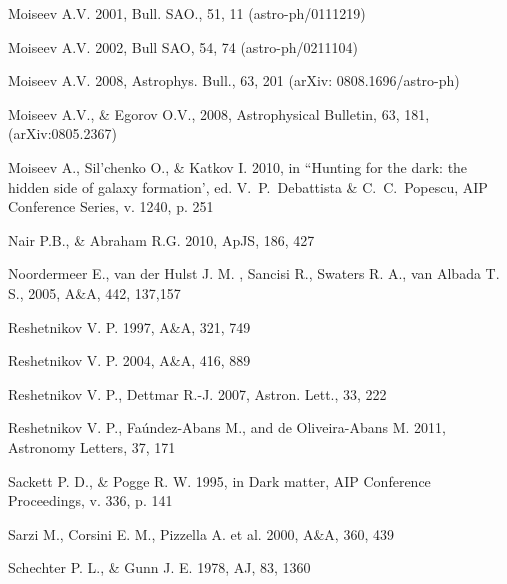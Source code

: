 \documentclass[useAMS,usenatbib]{mn2e}
\begin{document}
\begin{thebibliography}{}
Moiseev A.V. 2001, Bull. SAO., 51, 11 (astro-ph/0111219)

Moiseev A.V. 2002, Bull SAO, 54,   74 (astro-ph/0211104)

Moiseev A.V. 2008, Astrophys. Bull., 63, 201 (arXiv: 0808.1696/astro-ph)

Moiseev   A.V., \&   Egorov  O.V., 2008, Astrophysical Bulletin, 63, 181, (arXiv:0805.2367)


Moiseev A.,  Sil'chenko  O., \&  Katkov  I. 2010, in  ``Hunting for the dark: the hidden side of galaxy
formation', ed.  V.~P.~Debattista \& C.~C.~Popescu, AIP Conference Series, v. 1240, p. 251

Nair P.B., \&  Abraham R.G.   2010, ApJS, 186, 427

Noordermeer E., van der Hulst J. M. , Sancisi R.,  Swaters R. A.,   van Albada T. S., 2005,  A\&A, 442, 137,157

Reshetnikov V. P. 1997, A\&A, 321, 749

Reshetnikov V. P. 2004, A\&A, 416, 889

Reshetnikov V. P., Dettmar R.-J. 2007, Astron. Lett., 33, 222


Reshetnikov V. P., Fa\'{u}ndez-Abans M., and  de Oliveira-Abans M.  2011, Astronomy Letters, 37,  171

Sackett P. D., \& Pogge R. W. 1995,  in Dark matter,  AIP Conference Proceedings, v. 336, p. 141

Sarzi M., Corsini E. M., Pizzella A. et al. 2000, A\&A, 360, 439

Schechter P. L., \& Gunn J. E.  1978, AJ, 83, 1360


\end{thebibliography}
\end{document}
